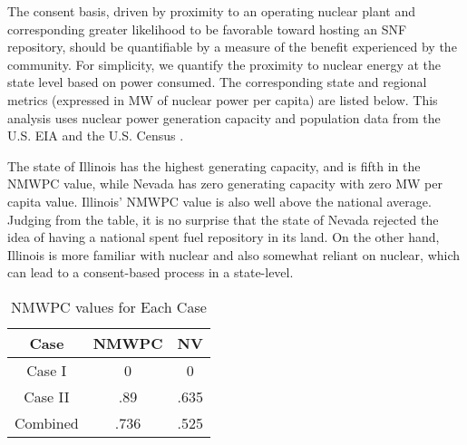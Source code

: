 The consent basis, driven by proximity to an operating nuclear plant and 
corresponding greater likelihood to be favorable toward hosting an \gls{SNF} 
repository, should be quantifiable by a measure of the benefit experienced by 
the community.  For simplicity, we quantify the proximity to nuclear energy at 
the state level  based on power consumed. The corresponding state and regional 
metrics (expressed in MW of nuclear power per capita) are listed below. This 
analysis uses nuclear power generation capacity and population data from the 
U.S. \gls{EIA} \cite{eia_state_2012} and the U.S. Census \cite{census}.  

\begin{table}[h]
	
	\centering
	\caption {\gls{NMWPC} values for different states}

	\end{table}
	
	
The state of Illinois has the highest generating capacity, and is fifth in the \gls{NMWPC}
 value, while Nevada has zero generating capacity with zero MW per capita value. 
Illinois' \gls{NMWPC} value is also well above the national average. Judging from the
table, it is no surprise that the state of Nevada rejected the idea of having a national
spent fuel repository in its land. On the other hand, Illinois is more familiar with 
nuclear and also somewhat reliant on nuclear, which can lead to a consent-based process
in a state-level. 

\begin{table}[h]
	
	\centering
	\caption {\gls{NMWPC} values for Each Case}

		\begin{tabular}{|c|c|c|}
			\hline
			Case & NMWPC & NV \\
			\hline
			Case I & 0 & 0\\
			Case II & .89 & .635\\
			Combined & .736 & .525 %
			\\
			\hline
                \end{tabular}
\end{table}


